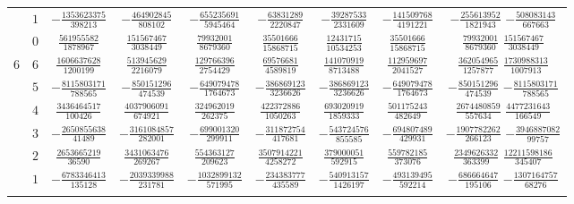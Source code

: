 \begin{table}
\begin{center}
\begin{tabular}{ccccccccc}
           &  $1$  &  $-\frac{ 1353623375}{ 398213}$  &  $-\frac{  464902845}{  808102}$  &  $-\frac{ 655235691}{ 5945464}$  &  $-\frac{  63831289}{ 2220847}$  &  $-\frac{  39287533}{ 2331609}$  &  $-\frac{ 141509768}{ 4191221} $  &  $-\frac{  255613952}{ 1821943}$  $-\frac{  508083143}{ 667663}$  \\ \addlinespace
           &  $0$  &  $ \frac{  561955582}{1878967}$  &  $ \frac{  151567467}{ 3038449}$  &  $ \frac{  79932001}{ 8679360}$  &  $ \frac{  35501666}{15868715}$  &  $ \frac{  12431715}{10534253}$  &  $ \frac{  35501666}{15868715} $  &  $ \frac{   79932001}{ 8679360}$  $ \frac{  151567467}{3038449}$  \\ \addlinespace
      $6$  &  $6$  &  $ \frac{ 1606637628}{1200199}$  &  $ \frac{  513945629}{ 2216079}$  &  $ \frac{ 129766396}{ 2754429}$  &  $ \frac{  69576681}{ 4589819}$  &  $ \frac{ 141070919}{ 8713488}$  &  $ \frac{ 112959697}{ 2041527} $  &  $ \frac{  362054965}{ 1257877}$  $ \frac{ 1730988313}{1007913}$  \\ \addlinespace
           &  $5$  &  $-\frac{ 8115803171}{ 788565}$  &  $-\frac{  850151296}{  474539}$  &  $-\frac{ 649079478}{ 1764673}$  &  $-\frac{ 386869123}{ 3236626}$  &  $-\frac{ 386869123}{ 3236626}$  &  $-\frac{ 649079478}{ 1764673} $  &  $-\frac{  850151296}{  474539}$  $-\frac{ 8115803171}{ 788565}$  \\ \addlinespace
           &  $4$  &  $ \frac{ 3436464517}{ 100426}$  &  $ \frac{ 4037906091}{  674921}$  &  $ \frac{ 324962019}{  262375}$  &  $ \frac{ 422372886}{ 1050263}$  &  $ \frac{ 693020919}{ 1859333}$  &  $ \frac{ 501175243}{  482649} $  &  $ \frac{ 2674480859}{  557634}$  $ \frac{ 4477231643}{ 166549}$  \\ \addlinespace
           &  $3$  &  $-\frac{ 2650855638}{  41489}$  &  $-\frac{ 3161084857}{  282001}$  &  $-\frac{ 699001320}{  299911}$  &  $-\frac{ 311872754}{  417681}$  &  $-\frac{ 543724576}{  855585}$  &  $-\frac{ 694807489}{  429931} $  &  $-\frac{ 1907782262}{  266123}$  $-\frac{ 3946887082}{  99757}$  \\ \addlinespace
           &  $2$  &  $ \frac{ 2653665219}{  36590}$  &  $ \frac{ 3431063476}{  269267}$  &  $ \frac{ 554363127}{  209623}$  &  $ \frac{3507914221}{ 4258272}$  &  $ \frac{ 379000051}{  592915}$  &  $ \frac{ 559782185}{  373076} $  &  $ \frac{ 2349626332}{  363399}$  $ \frac{12211598186}{ 345407}$  \\ \addlinespace
           &  $1$  &  $-\frac{ 6783346413}{ 135128}$  &  $-\frac{ 2039339988}{  231781}$  &  $-\frac{1032899132}{  571995}$  &  $-\frac{ 234383777}{  435589}$  &  $-\frac{ 540913157}{ 1426197}$  &  $-\frac{ 493139495}{  592214} $  &  $-\frac{  686664647}{  195106}$  $-\frac{ 1307164757}{  68276}$  \\ \addlinespace

\end{tabular}
\end{center}
\end{table}
